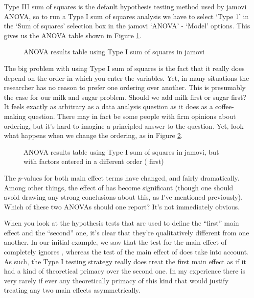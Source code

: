 Type III sum of squares is the default hypothesis testing method used by jamovi ANOVA, so to run a Type I sum of squares analysis we have to select `Type 1' in the `Sum of squares' selection box in the jamovi `ANOVA' - `Model' options. This gives us the ANOVA table shown in Figure \ref{fig:factorialanova16}.


\begin{figure}[!htb]
\begin{center}
\caption{ANOVA results table using Type I sum of squares in jamovi}
\label{fig:factorialanova16}
\HR
\end{center}
\end{figure}

The big problem with using Type I sum of squares is the fact that it really does depend on the order in which you enter the variables. Yet, in many situations the researcher has no reason to prefer one ordering over another. This is presumably the case for our milk and sugar problem. Should we add milk first or sugar first? It feels exactly as arbitrary as a data analysis question as it does as a coffee-making question. There may in fact be some people with firm opinions about ordering, but it's hard to imagine a principled answer to the question. Yet, look what happens when we change the ordering, as in Figure \ref{fig:factorialanova17}.

\begin{figure}[!htb]
\begin{center}
\caption{ANOVA results table using Type I sum of squares in jamovi, but with factors entered in a different order ( first)}
\label{fig:factorialanova17}
\HR
\end{center}
\end{figure}

The $p$-values for both main effect terms have changed, and fairly dramatically. Among other things, the effect of  has become significant (though one should avoid drawing any strong conclusions about this, as I've mentioned previously). Which of these two ANOVAs should one report? It's not immediately obvious. 

When you look at the hypothesis tests that are used to define the ``first'' main effect and the ``second'' one, it's clear that they're qualitatively different from one another. In our initial example, we saw that the test for the main effect of  completely ignores , whereas the test of the main effect of  does take  into account. As such, the Type I testing strategy really does treat the first main effect as if it had a kind of theoretical primacy over the second one. In my experience there is very rarely if ever any theoretically primacy of this kind that would justify treating any two main effects asymmetrically. 

